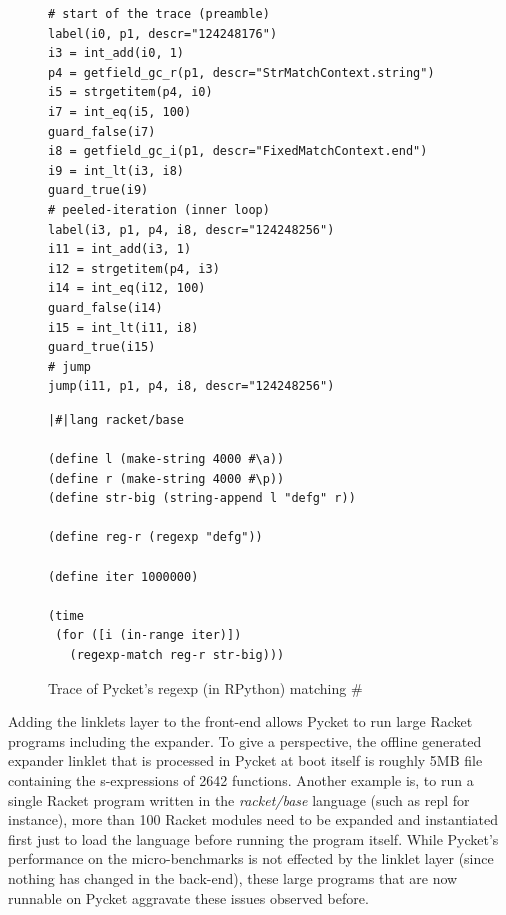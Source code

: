 \begin{figure}
    \centering
    \begin{minipage}[t]{0.38\textwidth}
      \begin{verbatim}
# start of the trace (preamble)
label(i0, p1, descr="124248176")
i3 = int_add(i0, 1)
p4 = getfield_gc_r(p1, descr="StrMatchContext.string")
i5 = strgetitem(p4, i0)
i7 = int_eq(i5, 100)
guard_false(i7)
i8 = getfield_gc_i(p1, descr="FixedMatchContext.end")
i9 = int_lt(i3, i8)
guard_true(i9)
# peeled-iteration (inner loop)
label(i3, p1, p4, i8, descr="124248256")
i11 = int_add(i3, 1)
i12 = strgetitem(p4, i3)
i14 = int_eq(i12, 100)
guard_false(i14)
i15 = int_lt(i11, i8)
guard_true(i15)
# jump
jump(i11, p1, p4, i8, descr="124248256")
    \end{verbatim}
    \end{minipage}
    \begin{minipage}[t]{0.38\textwidth}
      \begin{verbatim}
|#|lang racket/base

(define l (make-string 4000 #\a))
(define r (make-string 4000 #\p))
(define str-big (string-append l "defg" r))

(define reg-r (regexp "defg"))

(define iter 1000000)

(time
 (for ([i (in-range iter)])
   (regexp-match reg-r str-big)))
    \end{verbatim}
    \end{minipage}
    \caption{\small Trace of Pycket's regexp (in RPython) matching
      $\mathtt{\#}$}
    \label{fig:regexp-trace}
  \end{figure}

Adding the linklets layer to the front-end allows Pycket to run large
Racket programs including the expander. To give a perspective, the
offline generated expander linklet that is processed in Pycket at boot
itself is roughly 5MB file containing the s-expressions of 2642
functions. Another example is, to run a single Racket program written
in the \emph{racket/base} language (such as repl for instance), more
than 100 Racket modules need to be expanded and instantiated first
just to load the language before running the program itself. While
Pycket's performance on the micro-benchmarks is not effected by the
linklet layer (since nothing has changed in the back-end), these large
programs that are now runnable on Pycket aggravate these issues
observed before.

